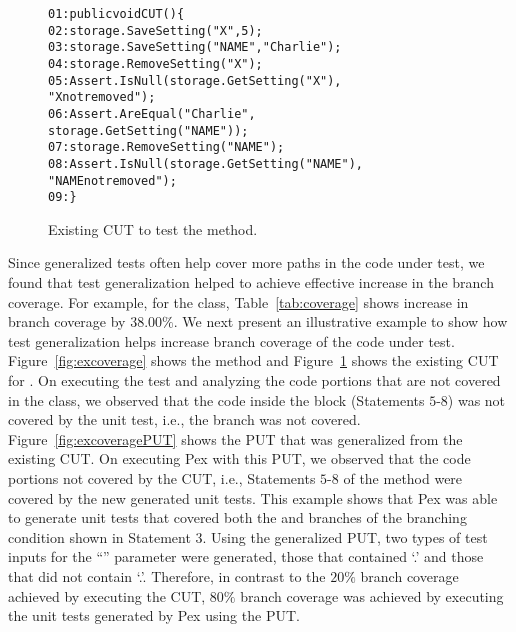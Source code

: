 \begin{figure}[t]
\begin{CodeOut}
\begin{alltt}
01: public void CUT() \{
02: \hspace*{0.07in}storage.SaveSetting("X",5);
03: \hspace*{0.07in}storage.SaveSetting("NAME","Charlie");
04: \hspace*{0.07in}storage.RemoveSetting("X");
05: \hspace*{0.07in}Assert.IsNull(storage.GetSetting("X"),
\hspace*{1.0in}"X not removed");
06: \hspace*{0.07in}Assert.AreEqual("Charlie", 
\hspace{1.0in}storage.GetSetting("NAME"));
07: \hspace*{0.07in}storage.RemoveSetting("NAME");
08: \hspace*{0.07in}Assert.IsNull(storage.GetSetting("NAME"), 
\hspace*{1.8in}"NAME not removed"); 
09: \hspace*{0.02in}\}
\end{alltt}
\end{CodeOut}  \vspace*{-3ex}
\caption{Existing CUT to test the  method.} \vspace*{-2ex}
\label{fig:excoveragetest}%
\end{figure}

Since generalized tests often help cover more paths in the code under test, we found that test generalization helped to achieve effective increase in the branch coverage. For example, for the  class, Table~\ref{tab:coverage} shows increase in branch coverage by $38.00\%$. We next present an illustrative example to show how test generalization helps increase branch coverage of the code under test. Figure~\ref{fig:excoverage} shows the  method and Figure~\ref{fig:excoveragetest} shows the existing CUT for . On executing the test and analyzing the code portions that are not covered in the  class, we observed that the code inside the  block (Statements $5$-$8$) was not covered by the unit test, i.e., the  branch was not covered. Figure~\ref{fig:excoveragePUT} shows the PUT that was generalized from the existing CUT. On executing Pex with this PUT, we observed that the code portions not covered by the CUT, i.e., Statements $5$-$8$ of the  method were covered by the new generated unit tests. This example shows that Pex was able to generate unit tests that covered both the  and  branches of the branching condition shown in Statement $3$. Using the generalized PUT, two types of test inputs for the ``'' parameter were generated, those that contained `.' and those that did not contain `.'. Therefore, in contrast to the $20\%$ branch coverage achieved by executing the CUT, $80\%$ branch coverage was achieved by executing the unit tests generated by Pex using the PUT. 

